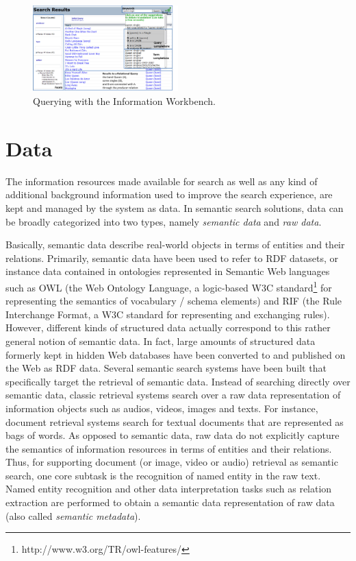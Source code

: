\begin{figure}
	\centering
		\includegraphics[width=0.5\textwidth]{figs/screenshot_iwb}
	\caption{Querying with the Information Workbench.}
	\label{fig:screenshot_iwb}
\end{figure}




\section{Data}\label{sec:data}
The information resources made available for search as well as any kind of additional background information used to improve the search experience, are kept and managed by the system as data. In semantic search solutions, data can be broadly categorized into two types, namely \emph{semantic data} and \emph{raw data}. 

Basically, semantic data describe real-world objects in terms of entities and their relations. Primarily, semantic data have been used to refer to RDF datasets, or instance data contained in ontologies represented in Semantic Web languages such as OWL (the Web Ontology Language, a logic-based W3C standard\footnote{http://www.w3.org/TR/owl-features/} for representing the semantics of vocabulary / schema elements) and RIF (the Rule Interchange Format, a W3C standard for representing and exchanging rules). However, different kinds of structured data actually correspond to this rather general notion of semantic data. In fact, large amounts of structured data formerly kept in hidden 
Web databases 
have been converted to and published on the Web as RDF data. Several semantic search systems have been built that specifically target the retrieval of semantic data. Instead of searching directly over semantic data, classic retrieval systems search over a raw data representation of information objects such as audios, videos, images and texts. For instance, document retrieval systems search for textual documents that are represented as bags of words. As opposed to semantic data, raw data do not explicitly capture the semantics of information resources in terms of entities and their relations. Thus, for supporting document (or image, video or audio) retrieval as semantic search, one core subtask is the recognition of named entity in the raw text. Named entity recognition and other data interpretation tasks such as relation extraction are performed to obtain a semantic data representation of raw data (also called \emph{semantic metadata}). 



